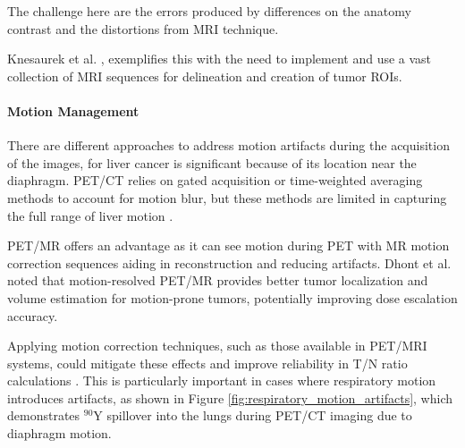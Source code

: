 The challenge here are the errors produced by differences on the anatomy contrast and the distortions from MRI technique.

Knesaurek et al. \cite{knesaurek2018}, exemplifies this with the need to implement and use a vast collection of MRI sequences for delineation and creation of tumor ROIs. 

\paragraph{Motion Management}

There are different approaches to address motion artifacts during the acquisition of the images, for liver cancer is significant because of its location near the diaphragm. PET/CT relies on gated acquisition or time-weighted averaging methods to account for motion blur, but these methods are limited in capturing the full range of liver motion \cite{Dhont2020}. 

PET/MR offers an advantage as it can see motion during PET with MR motion correction sequences %
aiding in reconstruction and reducing artifacts\cite{knesaurek2018}. Dhont et al. \cite{Dhont2020} noted that motion-resolved PET/MR provides better tumor localization and volume estimation for motion-prone tumors, potentially improving dose escalation accuracy.

Applying motion correction techniques, %
such as those available in PET/MRI systems, could mitigate these effects and improve reliability in T/N ratio calculations \cite{knesaurek2018}. This is particularly important in cases where respiratory motion introduces artifacts, as shown in Figure \ref{fig:respiratory_motion_artifacts}, which demonstrates $^{90}\text{Y}$ spillover into the lungs during PET/CT imaging due to diaphragm motion.


